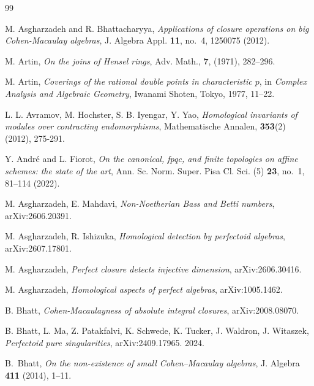 \documentclass[12pt,reqno]{amsart}
\theoremstyle{definition}
\theoremstyle{remark}
\theoremstyle{cited}
\theoremstyle{remark}
\theoremstyle{citeddef}
\begin{document}
	
	\begin{thebibliography}{99}
		
		
		 M. Asgharzadeh and R. Bhattacharyya,
		\emph{Applications of closure operations on big Cohen-Macaulay algebras},
		J. Algebra Appl. {\bf11}, no.~4, 1250075 (2012).
		
		
		 M. Artin,  \emph{
			On the joins of Hensel rings}, Adv. Math., {\bf7}, (1971), 282--296.
		
		
		M. Artin,
		\emph{Coverings of the rational double points in characteristic $p$},
		in \emph{Complex Analysis and Algebraic Geometry},
		Iwanami Shoten, Tokyo, 1977, 11--22.
		
		
		
		 L. L.
		Avramov, M. Hochster, S. B. Iyengar, Y. Yao,  \emph{Homological invariants of modules over contracting endomorphisms}, Mathematische Annalen, \textbf{353}(2) (2012), 275-291.
		
		Y. Andr\'e and L. Fiorot,
		\emph{On the canonical, fpqc, and finite topologies on affine schemes:
			the state of the art},
		Ann. Sc. Norm. Super. Pisa Cl. Sci. (5) {\bf23}, no.~1, 81--114 (2022).
		
		
		M. Asgharzadeh, E. Mahdavi, \emph{Non-Noetherian Bass and Betti numbers},   arXiv:2606.20391.
		
		M. Asgharzadeh, R. Ishizuka, 
		\emph{Homological detection by perfectoid algebras},  	arXiv:2607.17801.
		
		{M. Asgharzadeh}, \emph{Perfect closure detects injective dimension},  arXiv:2606.30416.
		
		 M. Asgharzadeh,   {\it Homological aspects of perfect algebras}, arXiv:1005.1462.
		
		
		B. Bhatt, \textit{Cohen-Macaulayness of absolute integral closures}, arXiv:2008.08070.
		
		 B.
		Bhatt, L.  Ma, Z. Patakfalvi, K. Schwede, K. Tucker, J. Waldron, 
		J. Witaszek, \emph{Perfectoid pure singularities},  arXiv:2409.17965. 2024.
		
		B.~Bhatt,
		\emph{On the non-existence of small Cohen--Macaulay algebras},
		J. Algebra \textbf{411} (2014), 1--11.
		

\end{thebibliography}
\end{document}
